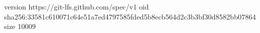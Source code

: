 version https://git-lfs.github.com/spec/v1
oid sha256:33581c610071c64e51a7ed4797585fded5b8ecb564d2c3b3bf30d8582bb07864
size 10009
